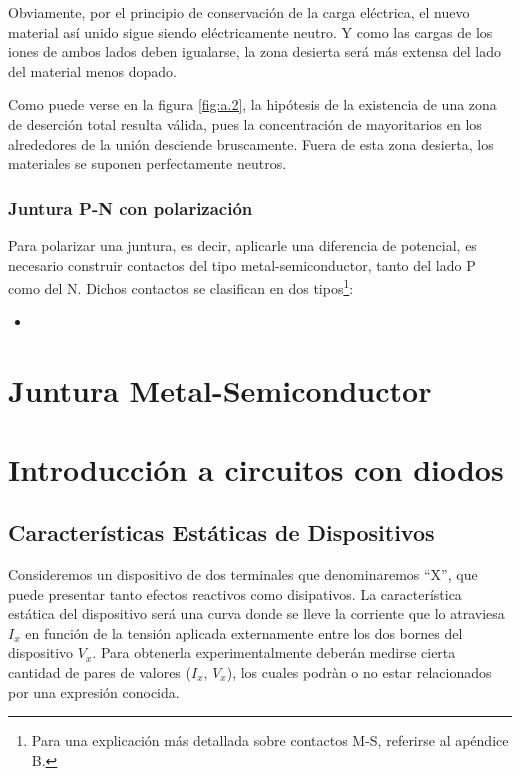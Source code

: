 \documentclass{book} %
\theoremstyle{definition}
\theoremstyle{definition}
\begin{document}
\begin{appendices}
Obviamente, por el principio de conservación de la carga eléctrica, el nuevo material así unido sigue siendo eléctricamente neutro. Y como las cargas de los iones de ambos lados deben igualarse, la zona desierta será más extensa del lado del material menos dopado.

Como puede verse en la figura \ref{fig:a.2}, la hipótesis de la existencia de una zona de deserción total resulta válida, pues la concentración de mayoritarios en los alrededores de la unión desciende bruscamente. Fuera de esta zona desierta, los materiales se suponen perfectamente neutros.

\subsection{Juntura P-N con polarización}

Para polarizar una juntura, es decir, aplicarle una diferencia de potencial, es necesario construir contactos del tipo metal-semiconductor, tanto del lado P como del N. Dichos contactos se clasifican en dos tipos\footnote{Para una explicación más detallada sobre contactos M-S, referirse al apéndice B.}:
\begin{itemize}
	\item 
\end{itemize}






\chapter{Juntura Metal-Semiconductor}
\chapter{Introducción a circuitos con diodos}
\section{Características Estáticas de Dispositivos}
Consideremos un dispositivo de dos terminales que denominaremos ``X'', que puede presentar tanto efectos reactivos como disipativos. La característica estática del dispositivo será una curva donde se lleve la corriente que lo atraviesa $I_x$ en función de la tensión aplicada externamente entre los dos bornes del dispositivo $V_x$. Para obtenerla experimentalmente deberán medirse cierta cantidad de pares de valores ($I_x$, $V_x$), los cuales podràn o no estar relacionados por una expresión conocida.


\end{appendices}
\end{document}

